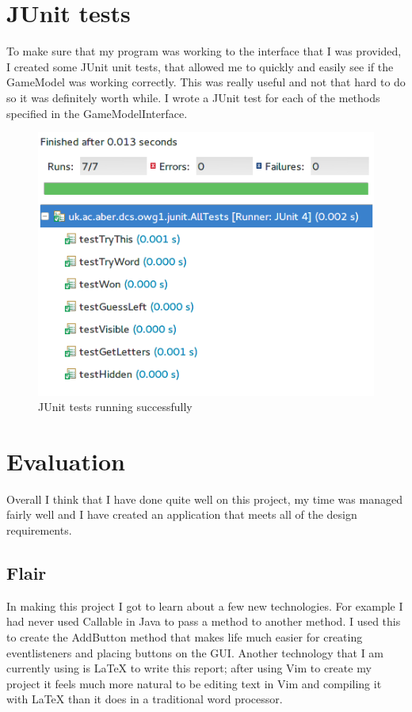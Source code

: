 \documentclass[notitlepage]{report}
\begin{document}
\section{JUnit tests}
To make sure that my program was working to the interface that I was provided, I created some JUnit unit tests, that allowed me to quickly and easily see if the GameModel was working correctly. This was really useful and not that hard to do so it was definitely worth while. I wrote a JUnit test for each of the methods specified in the GameModelInterface. 

\begin{figure}
  \centerline{\includegraphics[scale=0.5]{junit}}
  \caption{JUnit tests running successfully}
\end{figure}

\section{Evaluation}
Overall I think that I have done quite well on this project, my time was managed fairly well and I have created an application that meets all of the design requirements.

\subsection{Flair}
In making this project I got to learn about a few new technologies. For example I had never used Callable in Java to pass a method to another method. I used this to create the AddButton method that makes life much easier for creating eventlisteners and placing buttons on the GUI. Another technology that I am currently using is LaTeX to write this report; after using Vim to create my project it feels much more natural to be editing text in Vim and compiling it with LaTeX than it does in a traditional word processor.
\end{document}
